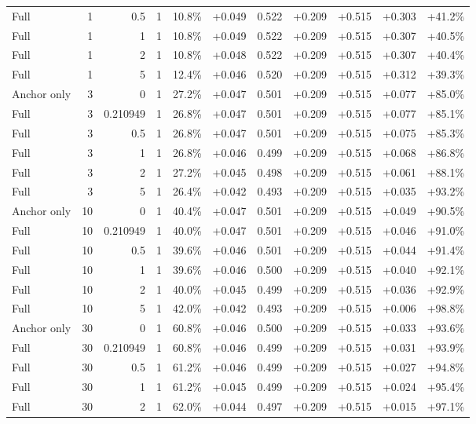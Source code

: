 \begin{table}[htbp]
\begin{tabular}{lrrrccccccc}
Full & 1 & 0.5 & 1 & 10.8\% & +0.049 & 0.522 & +0.209 & +0.515 & +0.303 & +41.2\% \\
Full & 1 & 1 & 1 & 10.8\% & +0.049 & 0.522 & +0.209 & +0.515 & +0.307 & +40.5\% \\
Full & 1 & 2 & 1 & 10.8\% & +0.048 & 0.522 & +0.209 & +0.515 & +0.307 & +40.4\% \\
Full & 1 & 5 & 1 & 12.4\% & +0.046 & 0.520 & +0.209 & +0.515 & +0.312 & +39.3\% \\
Anchor only & 3 & 0 & 1 & 27.2\% & +0.047 & 0.501 & +0.209 & +0.515 & +0.077 & +85.0\% \\
Full & 3 & 0.210949 & 1 & 26.8\% & +0.047 & 0.501 & +0.209 & +0.515 & +0.077 & +85.1\% \\
Full & 3 & 0.5 & 1 & 26.8\% & +0.047 & 0.501 & +0.209 & +0.515 & +0.075 & +85.3\% \\
Full & 3 & 1 & 1 & 26.8\% & +0.046 & 0.499 & +0.209 & +0.515 & +0.068 & +86.8\% \\
Full & 3 & 2 & 1 & 27.2\% & +0.045 & 0.498 & +0.209 & +0.515 & +0.061 & +88.1\% \\
Full & 3 & 5 & 1 & 26.4\% & +0.042 & 0.493 & +0.209 & +0.515 & +0.035 & +93.2\% \\
Anchor only & 10 & 0 & 1 & 40.4\% & +0.047 & 0.501 & +0.209 & +0.515 & +0.049 & +90.5\% \\
Full & 10 & 0.210949 & 1 & 40.0\% & +0.047 & 0.501 & +0.209 & +0.515 & +0.046 & +91.0\% \\
Full & 10 & 0.5 & 1 & 39.6\% & +0.046 & 0.501 & +0.209 & +0.515 & +0.044 & +91.4\% \\
Full & 10 & 1 & 1 & 39.6\% & +0.046 & 0.500 & +0.209 & +0.515 & +0.040 & +92.1\% \\
Full & 10 & 2 & 1 & 40.0\% & +0.045 & 0.499 & +0.209 & +0.515 & +0.036 & +92.9\% \\
Full & 10 & 5 & 1 & 42.0\% & +0.042 & 0.493 & +0.209 & +0.515 & +0.006 & +98.8\% \\
Anchor only & 30 & 0 & 1 & 60.8\% & +0.046 & 0.500 & +0.209 & +0.515 & +0.033 & +93.6\% \\
Full & 30 & 0.210949 & 1 & 60.8\% & +0.046 & 0.499 & +0.209 & +0.515 & +0.031 & +93.9\% \\
Full & 30 & 0.5 & 1 & 61.2\% & +0.046 & 0.499 & +0.209 & +0.515 & +0.027 & +94.8\% \\
Full & 30 & 1 & 1 & 61.2\% & +0.045 & 0.499 & +0.209 & +0.515 & +0.024 & +95.4\% \\
Full & 30 & 2 & 1 & 62.0\% & +0.044 & 0.497 & +0.209 & +0.515 & +0.015 & +97.1\% \\

\end{tabular}
\end{table}
